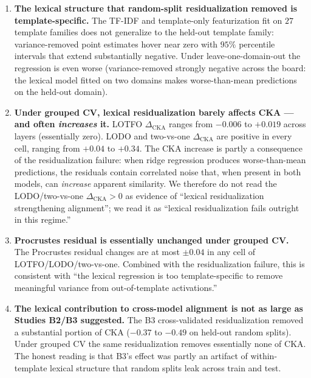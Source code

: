 \begin{enumerate}
    \item \textbf{The lexical structure that random-split
        residualization removed is template-specific.} The TF-IDF
        and template-only featurization fit on $27$ template
        families does not generalize to the held-out template family:
        variance-removed point estimates hover near zero with $95\%$
        percentile intervals that extend substantially negative.
        Under leave-one-domain-out the regression is even worse
        (variance-removed strongly negative across the board: the
        lexical model fitted on two domains makes worse-than-mean
        predictions on the held-out domain).
    \item \textbf{Under grouped CV, lexical residualization barely
        affects CKA --- and often \emph{increases} it.} LOTFO
        $\Delta_\text{CKA}$ ranges from $-0.006$ to $+0.019$
        across layers (essentially zero). LODO and two-vs-one
        $\Delta_\text{CKA}$ are positive in every cell, ranging from
        $+0.04$ to $+0.34$. The CKA increase is partly a consequence
        of the residualization failure: when ridge regression
        produces worse-than-mean predictions, the residuals contain
        correlated noise that, when present in both models, can
        \emph{increase} apparent similarity. We therefore do not read
        the LODO/two-vs-one $\Delta_\text{CKA} > 0$ as evidence of
        ``lexical residualization strengthening alignment''; we read
        it as ``lexical residualization fails outright in this
        regime.''
    \item \textbf{Procrustes residual is essentially unchanged
        under grouped CV.} The Procrustes residual changes are at
        most $\pm 0.04$ in any cell of LOTFO/LODO/two-vs-one. Combined
        with the residualization failure, this is consistent with
        ``the lexical regression is too template-specific to remove
        meaningful variance from out-of-template activations.''
    \item \textbf{The lexical contribution to cross-model alignment is
        not as large as Studies B2/B3 suggested.} The B3
        cross-validated residualization removed a substantial
        portion of CKA ($-0.37$ to $-0.49$ on held-out random splits).
        Under grouped CV the same residualization removes essentially
        none of CKA. The honest reading is that B3's effect was
        partly an artifact of within-template lexical structure that
        random splits leak across train and test.
\end{enumerate}

